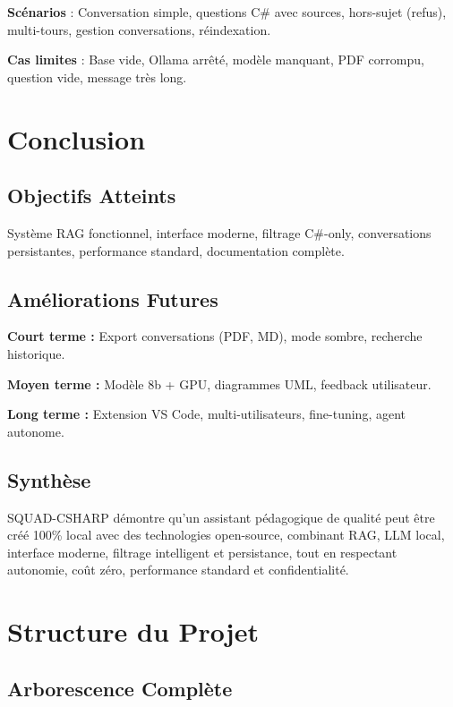\documentclass[12pt,a4paper]{report}
\begin{document}
\textbf{Scénarios} : Conversation simple, questions C\# avec sources, hors-sujet (refus), multi-tours, gestion conversations, réindexation.

\textbf{Cas limites} : Base vide, Ollama arrêté, modèle manquant, PDF corrompu, question vide, message très long.

\chapter{Conclusion}

\section{Objectifs Atteints}

Système RAG fonctionnel, interface moderne, filtrage C\#-only, conversations persistantes, performance standard, documentation complète.

\section{Améliorations Futures}

\textbf{Court terme :} Export conversations (PDF, MD), mode sombre, recherche historique.

\textbf{Moyen terme :} Modèle 8b + GPU, diagrammes UML, feedback utilisateur.

\textbf{Long terme :} Extension VS Code, multi-utilisateurs, fine-tuning, agent autonome.

\section{Synthèse}

SQUAD-CSHARP démontre qu'un assistant pédagogique de qualité peut être créé 100\% local avec des technologies open-source, combinant RAG, LLM local, interface moderne, filtrage intelligent et persistance, tout en respectant autonomie, coût zéro, performance standard et confidentialité.

\appendix

\chapter{Structure du Projet}

\section{Arborescence Complète}
\end{document}
